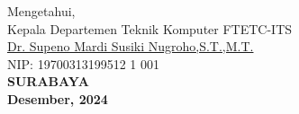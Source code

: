 \vspace{\fill}

\begin{center}
  Mengetahui,\\
  Kepala Departemen Teknik Komputer FTETC-ITS\\
  \vspace{10ex}
  \underline{Dr. Supeno Mardi Susiki Nugroho,S.T.,M.T.} \\ %
  NIP: 19700313199512 1 001 \\ %
  \vspace{10ex}
  \textbf{SURABAYA} \\
  \textbf{Desember, 2024}
\end{center}
\endgroup
